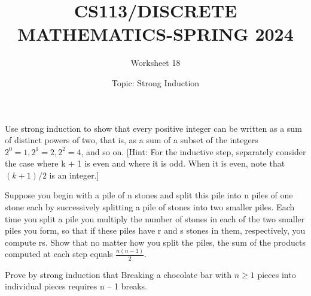 \documentclass{exam}
\title{CS113/DISCRETE MATHEMATICS-SPRING 2024}
\author{Worksheet 18}
\date{Topic: Strong Induction}
\begin{document}
\maketitle

\begin{center}
\end{center}

\vspace{5mm}

\vspace{5mm}


\vspace{5mm}
\begin{questions}

\question
Use strong induction to show that every positive integer
can be written as a sum of distinct powers of two, that is,
as a sum of a subset of the integers $2^0 =1, 2^1 =2, 2^2 =4$,
and so on. [Hint: For the inductive step, separately consider the case where k + 1 is even and where it is odd.
When it is even, note that $(k + 1)/2$ is an integer.]
\vspace{9in}

\question Suppose you begin with a pile of n stones and split this
pile into n piles of one stone each by successively splitting a pile of stones into two smaller piles. Each time you
split a pile you multiply the number of stones in each
of the two smaller piles you form, so that if these piles
have r and s stones in them, respectively, you compute
rs. Show that no matter how you split the piles, the sum
of the products computed at each step equals \( \frac{n(n-1)}{2} \).
\vspace{9in}

\question 
Prove by strong induction that Breaking a chocolate bar with $n \geq 1$ pieces into individual
pieces requires n – 1 breaks.


\vspace{9in}


\end{questions}
\end{document}

